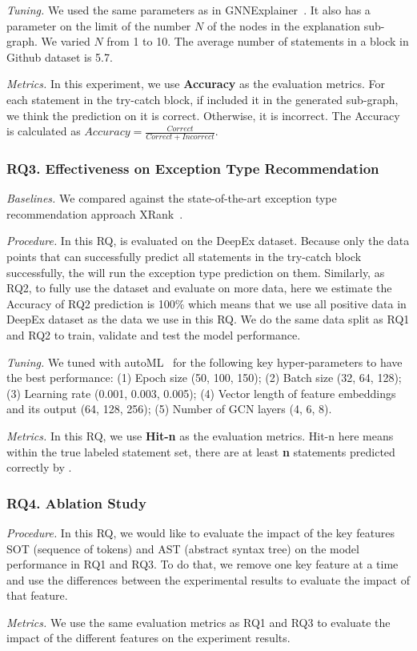 {\em Tuning.} We used the same parameters as in
GNNExplainer~\cite{GNNExplainer}. It also has a parameter on the limit
of the number $N$ of the nodes in the explanation sub-graph. We
varied $N$ from 1 to 10. The average number of statements in a
 block in Github dataset is 5.7.


{\em Metrics.} In this experiment, we use \textbf{Accuracy} as the
evaluation metrics. For each statement in the try-catch block, if
\tool included it in the generated sub-graph, we think the prediction
on it is correct. Otherwise, it is incorrect. The Accuracy is
calculated as $Accuracy = \frac{Correct}{Correct + Incorrect}$.

\subsubsection{RQ3. Effectiveness on Exception Type Recommendation}

{\em Baselines.} We compared {\tool} against the state-of-the-art exception type recommendation approach XRank~\cite{nguyen2020code}.

{\em Procedure.} In this RQ, \tool is evaluated on the DeepEx dataset. Because only the data points that \tool can successfully predict all statements in the try-catch block successfully, the \tool will run the exception type prediction on them. Similarly, as RQ2, to fully use the dataset and evaluate \tool on more data, here we estimate the Accuracy of RQ2 prediction is 100\% which means that we use all positive data in DeepEx dataset as the data we use in this RQ. We do the same data split as RQ1 and RQ2 to train, validate and test the model performance.

{\em Tuning.} We tuned {\tool} with autoML~\cite{NNI} for the following key hyper-parameters to have the best performance: (1) Epoch size (50, 100, 150); (2) Batch size (32, 64, 128); (3) Learning rate (0.001, 0.003, 0.005); (4) Vector length of feature embeddings and its output (64, 128, 256); (5) Number of GCN layers (4, 6, 8).

{\em Metrics.} In this RQ, we use \textbf{Hit-n} as the evaluation metrics. Hit-n here means within the true labeled statement set, there are at least \textbf{n} statements predicted correctly by \tool.

\subsubsection{RQ4. Ablation Study}

{\em Procedure.} In this RQ, we would like to evaluate the impact of the key features SOT (sequence of tokens) and AST (abstract syntax tree) on the model performance in RQ1 and RQ3. To do that, we remove one key feature at a time and use the differences between the experimental results to evaluate the impact of that feature.

{\em Metrics.} We use the same evaluation metrics as RQ1 and RQ3 to evaluate the impact of the different features on the experiment results.
